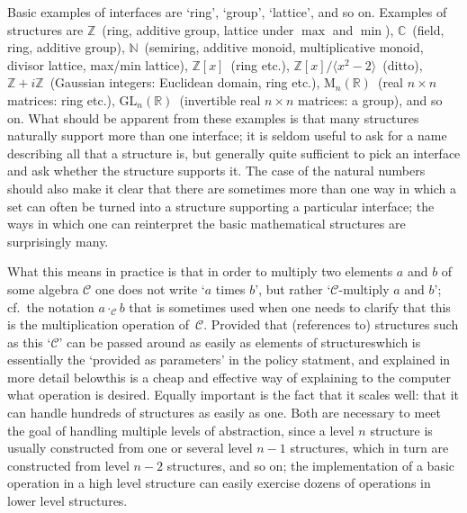 \documentclass{mtmtcl}
\theoremstyle{plain}
\theoremstyle{remark}
\begin{document}
Basic examples of interfaces are `ring', `group', `lattice', and so 
on. Examples of structures are $\mathbb{Z}$~(ring, additive group, 
lattice under $\max$ and $\min$), $\mathbb{C}$~(field, ring, additive 
group), $\mathbb{N}$~(semiring, additive monoid, multiplicative 
monoid, divisor lattice, max/min lattice), $\mathbb{Z}[x]$~(ring etc.), 
$\mathbb{Z}[x]\big/ \langle x^2 - 2\rangle$~(ditto), $\mathbb{Z} + 
i\mathbb{Z}$~(Gaussian integers: Euclidean domain, ring etc.), 
$\mathrm{M}_n(\mathbb{R})$~(real $n \times n$ matrices: ring etc.), 
$\mathrm{GL}_n(\mathbb{R})$~(invertible real $n \times n$ matrices: a 
group), and so on. What should be apparent from these examples is 
that many structures naturally support more than one interface; it is 
seldom useful to ask for a name describing all that a structure is, 
but generally quite sufficient to pick an interface and ask whether 
the structure supports it. The case of the natural numbers should 
also make it clear that there are sometimes more than one way in which 
a set can often be turned into a structure supporting a particular 
interface; the ways in which one can reinterpret the basic 
mathematical structures are surprisingly many.

What this means in practice is that in order to multiply two 
elements $a$ and $b$ of some algebra $\mathcal{C}$ one does not 
write `$a$ times $b$', but rather `$\mathcal{C}$-multiply $a$ and 
$b$'; cf.~the notation \(a \cdot_{\mathcal{C}} b\) that is 
sometimes used when one needs to clarify that this is the 
multiplication operation of~$\mathcal{C}$. Provided that (references 
to) structures such as this `$\mathcal{C}$' can be passed around as 
easily as elements of structures\Ldash which is essentially the 
`provided as parameters' in the policy statment, and explained in 
more detail below\Rdash this is a cheap and effective way of 
explaining to the computer what operation is desired. Equally 
important is the fact that it scales well: that it can handle 
hundreds of structures as easily as one. Both are necessary to meet 
the goal of handling multiple levels of abstraction, since a level 
$n$ structure is usually constructed from one or several level $n-1$ 
structures, which in turn are constructed from level $n-2$ 
structures, and so on; the implementation of a basic operation in 
a high level structure can easily exercise dozens of operations in 
lower level structures.
\end{document}
